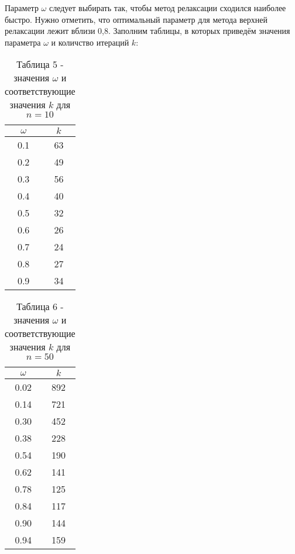 \documentclass[a4paper,12pt]{article}
\begin{document}
{Параметр $\omega$ следует выбирать так, чтобы метод релаксации сходился наиболее быстро. 
Нужно отметить, что оптимальный параметр для метода верхней релаксации лежит вблизи 0,8. 
Заполним таблицы, в которых приведём значения параметра $\omega$ и количство итераций $k$:
\begin{table}[h]
    \centering
    \begin{tabular}{|c|c|}
        \hline
        $\omega$ & $k$\\
        \hline
        0.1 & 63\\ \hline
        0.2 & 49\\ \hline
        0.3 & 56\\ \hline
        0.4 & 40\\ \hline
        0.5 & 32\\ \hline
        0.6 & 26\\ \hline
        0.7 & 24\\ \hline
        0.8 & 27\\ \hline
        0.9 & 34\\ \hline
    \end{tabular}
    \caption*{\small{Таблица 5 - значения $\omega$ и соответствующие значения $k$ для $n = 10$}}
\end{table}
\clearpage
\begin{table}[h]
    \centering
    \begin{tabular}{|c|c|}
        \hline
        $\omega$ & $k$\\
        \hline
        0.02 &  892\\ \hline
        0.14 &  721\\ \hline
        0.30 &  452\\ \hline
        0.38 &  228\\ \hline
        0.54 &  190\\ \hline
        0.62 &  141\\ \hline
        0.78 &  125\\ \hline
        0.84 &  117\\ \hline
        0.90 &  144\\ \hline
		0.94 &  159\\ \hline
    \end{tabular}
    \caption*{\small{Таблица 6 - значения $\omega$ и соответствующие значения $k$ для $n = 50$}}
\end{table}

}
\end{document}
